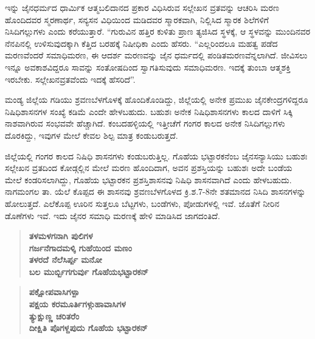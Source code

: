 ಇನ್ನು ಜೈನಧರ್ಮದ ಧಾರ್ಮಿಕ ಆತ್ಮಬಲಿದಾನದ ಪ್ರಕಾರ ವಿಧಿಸಿರುವ ಸಲ್ಲೇಖನ ವ್ರತವನ್ನು ಆಚರಿಸಿ ಮರಣ ಹೊಂದಿದವರ ಸ್ಮರಣಾರ್ಥ, ಸನ್ಯಸನ ವಿಧಿಯಿಂದ ಮಡಿದವರ ಸ್ಮಾರಕವಾಗಿ, ನಿಲ್ಲಿಸಿದ ಸ್ಮಾರಕ ಶಿಲೆಗಳಿಗೆ ನಿಸಿದಿಗಲ್ಲುಗಳು ಎಂದು ಕರೆಯುತ್ತಾರೆ. “ಗುರುವಿನ ಹತ್ತಿರ ಕುಳಿತು ಪ್ರಾಣ ತ್ಯಜಿಸಿದ ಸ್ಥಳಕ್ಕೆ, ಆ ಸ್ಥಳವನ್ನು ಮುಂದಿನವರ ನೆನಪಿನಲ್ಲಿ ಉಳಿಸುವುದಕ್ಕಾಗಿ ಕೆತ್ತಿದ ಬರಹಕ್ಕೆ ನಿಷೀಧಿಕಾ ಎಂದು ಹೆಸರು. “ಎಲ್ಲರಿಂದಲೂ ಮಹತ್ವ ಪಡೆದ ಮರಣವೆಂದರೆ ಸಮಾಧಿಮರಣ, ಈ ಆದರ್ಶ ಮರಣವನ್ನು ಜೈನ ಧರ್ಮದಲ್ಲಿ ಪಂಡಿತಮರಣವೆನ್ನಲಾಗಿದೆ. ಜೀವಿಸಲು ಇನ್ನೂ ಅವಕಾಶವಿದ್ದರೂ ಸಾವನ್ನು ಸಂತೋಷದಿಂದ ಸ್ವಾಗತಿಸುವುದು ಸಮಾಧಿಮರಣ. ಇದಕ್ಕೆ ತುಂಬಾ ಆತ್ಮಶಕ್ತಿ ಇರಬೇಕು. ಸಲ್ಲೇಖನವ್ರತವೆಂದು ಇದಕ್ಕೆ ಹೆಸರಿದೆ”.

ಮಂಡ್ಯ ಜಿಲ್ಲೆಯ ಗಡಿಯು ಶ್ರವಣಬೆಳಗೊಳಕ್ಕೆ ಹೊಂದಿಕೊಂಡಿದ್ದು, ಜಿಲ್ಲೆಯಲ್ಲಿ ಅನೇಕ ಪ್ರಮುಖ ಜೈನಕೇಂದ್ರ\-ಗಳಿದ್ದರೂ ನಿಷಿಧಿಶಾಸನಗಳ ಸಂಖ್ಯೆ ಕಡಿಮೆ ಎಂದೇ ಹೇಳಬಹುದು. ಬಹುಶಃ ಅನೇಕ ನಿಷಿಧಿಶಾಸನಗಳು ಕಾಲದ ದಾಳಿಗೆ ಸಿಕ್ಕಿ ನಾಶವಾಗಿರುವ ಸಂಭವವೇ ಹೆಚ್ಚಾಗಿದೆ. ಕಂಬದಹಳ್ಳಿಯಲ್ಲಿ ಇತ್ತೀಚೆಗೆ ಗಂಗರ ಕಾಲದ ಅನೇಕ ನಿಸಿದಿಗಲ್ಲುಗಳು ದೊರಕಿದ್ದು, ಇವುಗಳ ಮೇಲೆ ಕೇವಲ ಶಿಲ್ಪ ಮಾತ್ರ ಕಂಡುಬರುತ್ತದೆ.

ಜಿಲ್ಲೆಯಲ್ಲಿ ಗಂಗರ ಕಾಲದ ನಿಷಿಧಿ ಶಾಸನಗಳು ಕಂಡುಬರುತ್ತಿಲ್ಲ. ಗೊಹೆಯ ಭಟ್ಟಾರಕನೆಂಬ ಜೈನಸನ್ಯಾಸಿಯು ಬಹುಶಃ ಸಲ್ಲೇಖನ ವ್ರತದಿಂದ ಕೋಡ್ಗಲ್ಲಿನ ಮೇಲೆ ಮರಣ ಹೊಂದಿದಾಗ, ಅವನ ಪ್ರಶಸ್ತಿಯನ್ನು ಬಹುಶಃ ಅದೇ ಬಂಡೆಯ ಮೇಲೆ ಕಂಡರಿಸಲಾಗಿದ್ದು, ಗೊಹೆಯ ಭಟ್ಟಾರಕನ ಪ್ರಶಸ್ತಿಶಾಸನವು ನಿಷಿಧಿ ಶಾಸನವಾಗಿದೆ ಎಂದು ಹೇಳಬಹುದು. ನಾಗಮಂಗಲ ತಾ. ಯೆಲೆ ಕೊಪ್ಪದ ಈ ಶಾಸನವು ಶ್ರವಣಬೆಳಗೊಳದ ಕ್ರಿ.ಶ.7-8ನೇ ಶತಮಾನದ ನಿಸಿದಿ ಶಾಸನಗಳನ್ನು ಹೋಲುತ್ತದೆ. ಎಲೆಕೊಪ್ಪ ಊರಿನ ಸುತ್ತಲೂ ಬೆಟ್ಟಗಳು, ಬಂಡೆಗಳು, ಪೋಡುಗಳಲ್ಲಿ ಇವೆ. ಜೊತೆಗೆ ನೀರಿನ ಡೊಣೆಗಳು ಇವೆ. ಇದು ಜೈನರ ಸಮಾಧಿ ಮರಣಕ್ಕೆ ಹೇಳಿ ಮಾಡಿಸಿದ ಜಾಗದಂತಿದೆ.

\begin{verse}
\textbf{ತಳಮಳಗನಾಗಿ ಪುಲಿಗಳ} \\\textbf{ಗರ್ಜನೆಗಾದಮಳ್ಕಿ ಗುಹೆಯಿಂದ ಮಣಂ} \\\textbf{ತಳರದೆ ನೆಲೆಸಿರ್ಪ್ಪ ಮನೋ} \\\textbf{ಬಲ ಮುರ್ಬ್ಬಿಗಗುರ್ವು ಗೊಹೆಯಭಟ್ಟಾರಕನ್​ }
\end{verse}

\begin{verse}
\textbf{ಪಕ್ಷೋಪವಾಸಿಗಳ್ಪಾ} \\\textbf{ಪಕ್ಷಯ ಕರಮೂರ್ತಿಗಳ್ಗುಹಾವಾಸಿಗಳ} \\\textbf{ತ್ಯುಕ್ಷುಣ್ಣ ಚರಿತರೆಂ} \\\textbf{ದೀಕ್ಷಿತಿ ಪೊಗಳ್ದಪುದು ಗೊಹೆಯ ಭಟ್ಟಾರಕನ್​ }
\end{verse}

